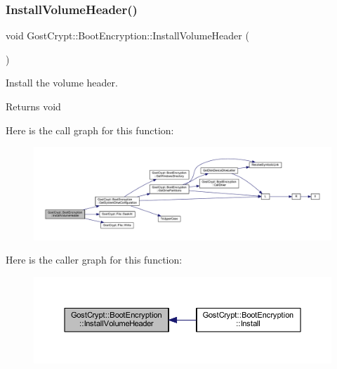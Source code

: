 \subsubsection{\texorpdfstring{Install\+Volume\+Header()}{InstallVolumeHeader()}}
{\footnotesize\ttfamily void Gost\+Crypt\+::\+Boot\+Encryption\+::\+Install\+Volume\+Header (\begin{DoxyParamCaption}{ }\end{DoxyParamCaption})\hspace{0.3cm}{\ttfamily [protected]}}



Install the volume header. 

\begin{DoxyReturn}{Returns}
void 
\end{DoxyReturn}
Here is the call graph for this function\+:
\nopagebreak
\begin{figure}[H]
\begin{center}
\leavevmode
\includegraphics[width=350pt]{class_gost_crypt_1_1_boot_encryption_ad9957a4693a05ee0e8b4a142a7f5454c_cgraph}
\end{center}
\end{figure}
Here is the caller graph for this function\+:
\nopagebreak
\begin{figure}[H]
\begin{center}
\leavevmode
\includegraphics[width=350pt]{class_gost_crypt_1_1_boot_encryption_ad9957a4693a05ee0e8b4a142a7f5454c_icgraph}
\end{center}
\end{figure}
\mbox{\label{class_gost_crypt_1_1_boot_encryption_ae15a4ec32e1605b7dcd5979a4334601f}} 
